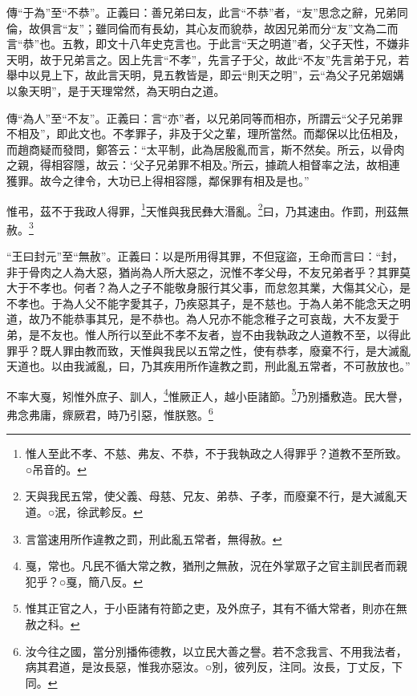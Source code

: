 {\noindent\zhuan{}\fzbyks 傳“于為”至“不恭”。正義曰：善兄弟曰友，此言“不恭”者，“友”思念之辭，兄弟同倫，故俱言“友”；雖同倫而有長幼，其心友而貌恭，故因兄弟而分“友”文為二而言“恭”也。五教，即文十八年史克言也。于此言“天之明道”者，父子天性，不嫌非天明，故于兄弟言之。因上先言“不孝”，先言子于父，故此“不友”先言弟于兄，若舉中以見上下，故此言天明，見五教皆是，即云“則天之明”，云“為父子兄弟姻媾以象天明”，是于天理常然，為天明白之道。 \par}

{\noindent\zhuan{}\fzbyks 傳“為人”至“不友”。正義曰：言“亦”者，以兄弟同等而相亦，所謂云“父子兄弟罪不相及”，即此文也。不孝罪子，非及于父之輩，理所當然。而鄰保以比伍相及，而趙商疑而發問，鄭答云：“太平制，此為居殷亂而言，斯不然矣。所云，以骨肉之親，得相容隱，故云：‘父子兄弟罪不相及。’所云，據疏人相督率之法，故相連獲罪。故今之律令，大功已上得相容隱，鄰保罪有相及是也。” \par}

惟弔，茲不于我政人得罪，\footnote{惟人至此不孝、不慈、弗友、不恭，不于我執政之人得罪乎？道教不至所致。○吊音的。}天惟與我民彝大湣亂。\footnote{天與我民五常，使父義、母慈、兄友、弟恭、子孝，而廢棄不行，是大滅亂天道。○泯，徐武軫反。}曰，乃其速由。作罰，刑茲無赦。\footnote{言當速用所作違教之罰，刑此亂五常者，無得赦。}

{\noindent\shu{}\fzkt “王曰封元”至“無赦”。正義曰：以是所用得其罪，不但寇盜，王命而言曰：“封，非于骨肉之人為大惡，猶尚為人所大惡之，況惟不孝父母，不友兄弟者乎？其罪莫大于不孝也。何者？為人之子不能敬身服行其父事，而怠忽其業，大傷其父心，是不孝也。于為人父不能字愛其子，乃疾惡其子，是不慈也。于為人弟不能念天之明道，故乃不能恭事其兄，是不恭也。為人兄亦不能念稚子之可哀哉，大不友愛于弟，是不友也。惟人所行以至此不孝不友者，豈不由我執政之人道教不至，以得此罪乎？既人罪由教而致，天惟與我民以五常之性，使有恭孝，廢棄不行，是大滅亂天道也。以由我滅亂，曰，乃其疾用所作違教之罰，刑此亂五常者，不可赦放也。” \par}

不率大戛，矧惟外庶子、訓人，\footnote{戛，常也。凡民不循大常之教，猶刑之無赦，況在外掌眾子之官主訓民者而親犯乎？○戛，簡八反。}惟厥正人，越小臣諸節。\footnote{惟其正官之人，于小臣諸有符節之吏，及外庶子，其有不循大常者，則亦在無赦之科。}乃別播敷造。民大譽，弗念弗庸，瘝厥君，時乃引惡，惟朕憝。\footnote{汝今往之國，當分別播佈德教，以立民大善之譽。若不念我言、不用我法者，病其君道，是汝長惡，惟我亦惡汝。○別，彼列反，注同。汝長，丁丈反，下同。}


